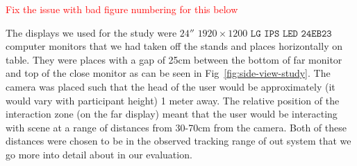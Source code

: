 \textcolor{red}{Fix the issue with bad figure numbering for this below}
\begin{invisBox}  
	\hfill
\end{invisBox}

The displays we used for the study were $24''$ $1920 \times 1200$ $\texttt{LG IPS LED 24EB23}$ computer monitors that we had taken off the stands and places horizontally on table. They were places with a gap of 25cm between the bottom of far monitor and top of the close monitor as can be seen in Fig~\ref{fig:side-view-study}. The camera was placed such that the head of the user would be approximately (it would vary with participant height) 1 meter away. The relative position of the interaction zone (on the far display) meant that the user would be interacting with scene at a range of distances from 30-70cm from the camera. Both of these distances were chosen to be in the observed tracking range of out system that we go more into detail about in our evaluation. \\

